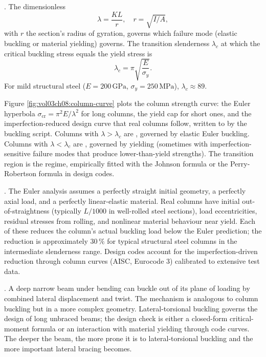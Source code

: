 . The dimensionless
\[
\lambda = \frac{KL}{r}, \quad r = \sqrt{I/A},
\]
with $r$ the section's radius of gyration, governs which failure
mode (elastic buckling or material yielding) governs. The transition
slenderness $\lambda_c$ at which the critical buckling stress equals
the yield stress is
\[
\lambda_c = \pi\sqrt{\frac{E}{\sigma_y}}.
\]
For mild structural steel ($E = 200\,\text{GPa}$, $\sigma_y =
250\,\text{MPa}$), $\lambda_c \approx 89$.



Figure \ref{fig:vol03ch08:column-curve} plots the column strength
curve: the Euler hyperbola $\sigma_{\text{cr}}=\pi^2E/\lambda^2$ for
long columns, the yield cap for short ones, and the imperfection-reduced
design curve that real columns follow, written to
 by the buckling script. Columns
with $\lambda >
\lambda_c$ are , governed by elastic Euler
buckling. Columns with $\lambda < \lambda_c$ are , governed by yielding (sometimes with imperfection-
sensitive failure modes that produce lower-than-yield strengths).
The transition region is the  regime,
empirically fitted with the Johnson formula or the Perry-Robertson
formula in design codes.

. The Euler analysis
assumes a perfectly straight initial geometry, a perfectly axial
load, and a perfectly linear-elastic material. Real columns have
initial out-of-straightness (typically $L/1000$ in well-rolled steel
sections), load eccentricities, residual stresses from rolling, and
nonlinear material behaviour near yield. Each of these reduces the
column's actual buckling load below the Euler prediction; the
reduction is approximately $30\,\%$ for typical structural steel
columns in the intermediate slenderness range. Design codes account
for the imperfection-driven reduction through column curves (AISC,
Eurocode 3) calibrated to extensive test data.

. A deep narrow beam under
bending can buckle out of its plane of loading by combined lateral
displacement and twist. The mechanism is analogous to column
buckling but in a more complex geometry. Lateral-torsional buckling
governs the design of long unbraced beams; the design check is
either a closed-form critical-moment formula or an interaction with
material yielding through code curves. The deeper the beam, the more
prone it is to lateral-torsional buckling and the more important
lateral bracing becomes.

